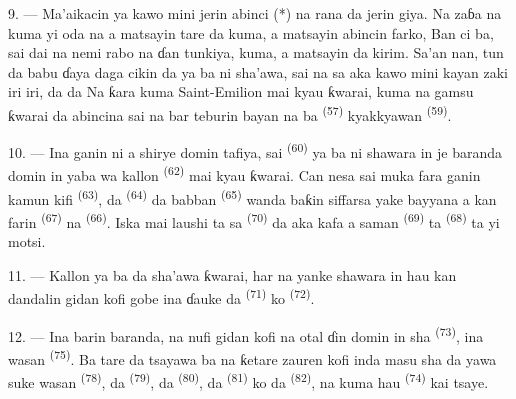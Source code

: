 \VUsaut{4.0mm}
\VUsaut{3.0mm}

9. --- Ma’aikacin ya kawo mini jerin abinci (*) na rana da jerin giya.
Na zaɓa na kuma yi oda na  a matsayin
 tare da  kuma, a matsayin
abincin farko,  Ban ci 
ba, sai dai na nemi rabo na  ɗan tunkiya, kuma, a
matsayin  da kirim. Sa’an nan, tun
da babu ɗaya daga cikin  da ya ba ni sha’awa,
sai na sa aka kawo mini kayan zaki iri iri,  da
 da  Na ƙara kuma 
Saint-Emilion mai kyau ƙwarai, kuma na gamsu ƙwarai da abincina sai na
bar teburin bayan na ba  \textsuperscript{(57)}
kyakkyawan  \textsuperscript{(59)}.

10. --- Ina ganin ni a shirye domin tafiya, sai 
\textsuperscript{(60)} ya ba ni shawara in je baranda domin in yaba wa
kallon  \textsuperscript{(62)} mai kyau ƙwarai. Can nesa
sai muka fara ganin  kamun kifi
\textsuperscript{(63)}, da 
\textsuperscript{(64)} da babban 
\textsuperscript{(65)} wanda baƙin siffarsa yake bayyana a kan farin
 \textsuperscript{(67)} na 
\textsuperscript{(66)}. Iska mai laushi ta sa 
\textsuperscript{(70)} da aka kafa a saman 
\textsuperscript{(69)} ta  \textsuperscript{(68)} ta yi motsi.

\VUsaut{3.0mm}
\VUsaut{3.0mm}

11. --- Kallon ya ba da sha’awa ƙwarai, har na yanke shawara in hau
kan dandalin gidan kofi gobe ina ɗauke da 
\textsuperscript{(71)} ko 
\textsuperscript{(72)}.

12. --- Ina barin baranda, na nufi gidan kofi na otal ɗin domin in sha
 \textsuperscript{(73)}, ina wasan 
\textsuperscript{(75)}. Ba tare da tsayawa ba na ƙetare zauren kofi inda
masu sha da yawa suke wasan  \textsuperscript{(78)}, da
 \textsuperscript{(79)}, da 
\textsuperscript{(80)}, da  \textsuperscript{(81)} ko da
 \textsuperscript{(82)}, na kuma hau 
\textsuperscript{(74)} kai tsaye.


